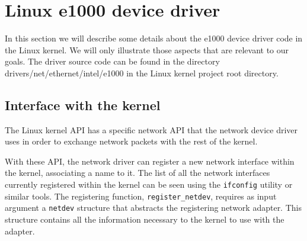 \section{Linux e1000 device driver}
In this section we will describe some details about the e1000 device driver code in the Linux kernel.
We will only illustrate those aspects that are relevant to our goals.
The driver source code can be found in the directory drivers/net/ethernet/intel/e1000 in the Linux kernel project root directory.

\subsection{Interface with the kernel}
The Linux kernel API has a specific network API that the network device driver uses in order to exchange network packets with
the rest of the kernel.

With these API, the network driver can register a new network interface within the kernel, associating a name to it.
The list of all the network interfaces currently registered within the kernel can be seen using the \texttt{ifconfig} utility or 
similar tools.
The registering function, \texttt{register\_netdev}, requires as input argument a \texttt{netdev} structure that abstracts the
registering network adapter. This structure contains all the information necessary to the kernel to use with the adapter.

